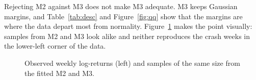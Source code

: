 Rejecting M2 against M3 does not make M3 adequate. M3 keeps Gaussian margins, and Table~\ref{tab:desc} and Figure~\ref{fig:qq} show that the margins are where the data depart most from normality. Figure~\ref{fig:scatter} makes the point visually: samples from M2 and M3 look alike and neither reproduces the crash weeks in the lower-left corner of the data.

\begin{figure}[tb]
\centering
{}
\caption{Observed weekly log-returns (left) and samples of the same size from the fitted M2 and M3.}
\label{fig:scatter}
\end{figure}
